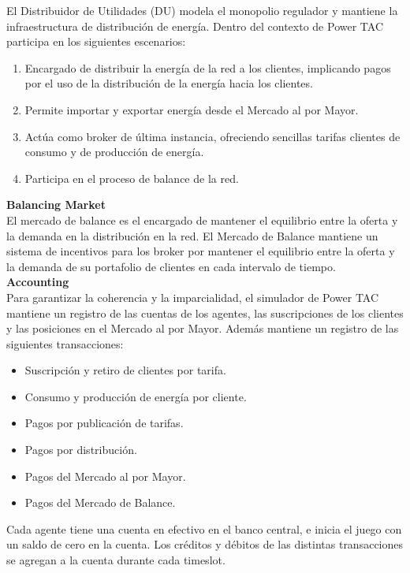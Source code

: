 El Distribuidor de Utilidades (DU) modela el monopolio regulador y mantiene la infraestructura de distribución de energía. Dentro del contexto de Power TAC participa en los siguientes escenarios:

\begin{enumerate}
	\item Encargado de distribuir la energía de la red a los clientes, implicando pagos por el uso de la distribución de la energía hacia los clientes.
	\item Permite importar y exportar energía desde el Mercado al por Mayor.
	\item Actúa como broker de última instancia, ofreciendo sencillas tarifas clientes de consumo y de producción de energía.
	\item Participa en el proceso de balance de la red.
\end{enumerate}

\textbf{Balancing Market}\\

El mercado de balance es el encargado de mantener el equilibrio entre la oferta y la demanda en la distribución en la red. 
El Mercado de Balance mantiene un sistema de incentivos para los broker por mantener el equilibrio entre la oferta y la demanda de su portafolio de clientes en cada intervalo de tiempo.\\

\textbf{Accounting}\\

Para garantizar la coherencia y la imparcialidad, el simulador de Power TAC mantiene un registro de las cuentas de los agentes, las suscripciones de los clientes y las posiciones en el Mercado al por Mayor. Además mantiene un registro de las siguientes transacciones:

\begin{itemize}
	\item Suscripción y retiro de clientes por tarifa.
	\item Consumo y producción de energía por cliente.
	\item Pagos por publicación de tarifas.
	\item Pagos por distribución.
	\item Pagos del Mercado al por Mayor.
	\item Pagos del Mercado de Balance.    
\end{itemize}

Cada agente tiene una cuenta en efectivo en el banco central, e inicia el juego con un saldo de cero en la cuenta. Los créditos y débitos de las distintas transacciones se agregan a la cuenta durante cada timeslot.\\

